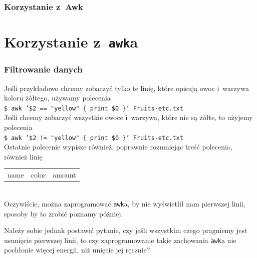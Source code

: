 \documentclass[10pt,t]{beamer}
\begin{document}
\begin{frame}
  \frametitle{Korzystanie z~Awk}




\end{frame}








\section{Korzystanie z~\texttt{awk}a}














\begin{frame}
  \frametitle{Filtrowanie danych}


  Jeśli przykładowo chcemy zobaczyć tylko te linię, które opisują
  owoc i~warzywa koloru żółtego, używamy polecenia \\
  \texttt{\$ awk '\$2 == "yellow" \{ print \$0 \}' Fruits-etc.txt} \\
  Jeśli chcemy zobaczyć wszystkie owoce i~warzywa, które \alert{nie} są
  żółte, to użyjemy polecenia \\
  \texttt{\$ awk '\$2 != "yellow" \{ print \$0 \}' Fruits-etc.txt} \\
  Ostatnie polecenie wypisze również, poprawnie rozumiejąc treść polecenia,
  również linię \\
  \begin{tabular}{l l l}
    name & color & amount \\
  \end{tabular} \\
  Oczywiście, można zaprogramować \texttt{awk}a, by nie wyświetlił nam
  pierwszej linii, sposoby by to zrobić poznamy później.

  Należy sobie jednak postawić pytanie, czy jeśli wszystkim czego pragniemy
  jest usunięcie pierwszej linii, to czy zaprogramowanie takie zachowania
  \texttt{awk}a nie pochłonie więcej energii, niż unięcie jej ręcznie?

\end{frame}
\end{document}
